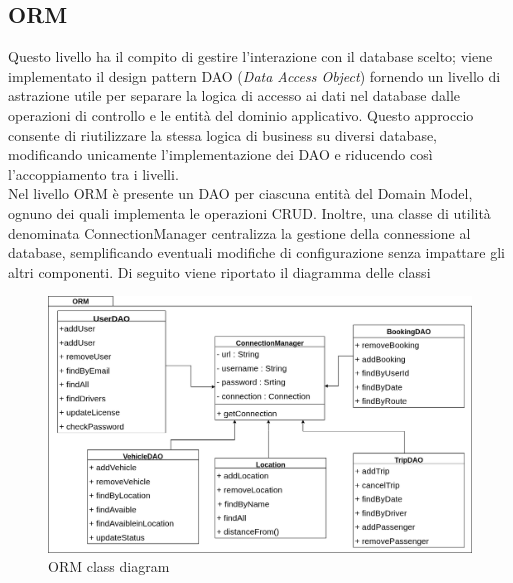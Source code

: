 \subsection{ORM}\label{subsec:ORM}
Questo livello ha il compito di gestire l'interazione con il database scelto; viene implementato il design pattern DAO (\textit{Data Access Object}) fornendo un livello di astrazione utile per separare la logica di accesso ai dati nel database dalle operazioni di controllo e le entità del dominio applicativo.
Questo approccio consente di riutilizzare la stessa logica di business su diversi database, modificando unicamente l’implementazione dei DAO e riducendo così l’accoppiamento tra i livelli.\\
Nel livello ORM è presente un DAO per ciascuna entità del Domain Model, ognuno dei quali implementa le operazioni CRUD. Inoltre, una classe di utilità denominata ConnectionManager centralizza la gestione della connessione al database, semplificando eventuali modifiche di configurazione senza impattare gli altri componenti.
Di seguito viene riportato il diagramma delle classi
\begin{figure}[H]
    \centering
    \includegraphics[width=1.1\linewidth]{Images/ORM_diag.png}
    \caption{ORM class diagram}
    \label{fig:ORMdiag}
\end{figure}
